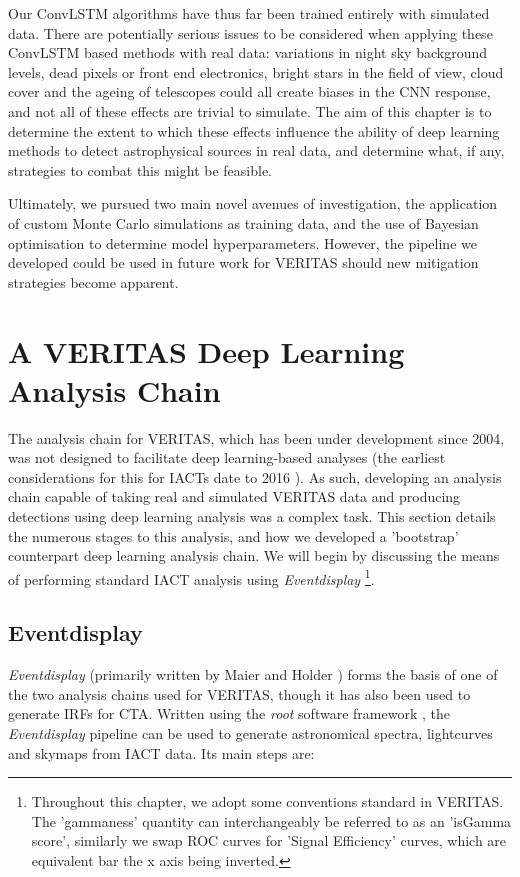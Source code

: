 Our ConvLSTM algorithms have thus far been trained entirely with simulated data.  There are potentially serious issues to be considered when applying these ConvLSTM based methods with real data: variations in night sky background levels, dead pixels or front end electronics, bright stars in the field of view, cloud cover and the ageing of telescopes could all create biases in the CNN response, and not all of these effects are trivial to simulate. The aim of this chapter is to determine the extent to which these effects influence the ability of deep learning methods to detect astrophysical sources in real data, and determine what, if any, strategies to combat this might be feasible. 

Ultimately, we pursued two main novel avenues of investigation, the application of custom Monte Carlo simulations as training data, and the use of Bayesian optimisation to determine model hyperparameters. However, the pipeline we developed could be used in future work for VERITAS should new mitigation strategies become apparent.

\section{A VERITAS Deep Learning Analysis Chain}
The analysis chain for VERITAS, which has been under development since 2004, was not designed to facilitate deep learning-based analyses (the earliest considerations for this for IACTs date to 2016 \cite{feng2016}). As such, developing an analysis chain capable of taking real and simulated VERITAS data and producing detections using deep learning analysis was a complex task. This section details the numerous stages to this analysis, and how we developed a 'bootstrap' counterpart deep learning analysis chain. We will begin by discussing the means of performing standard IACT analysis using \textit{Eventdisplay} \footnote{Throughout this chapter, we adopt some conventions standard in VERITAS. The 'gammaness' quantity can interchangeably be referred to as an 'isGamma score', similarly we swap ROC curves for 'Signal Efficiency' curves, which are equivalent bar the x axis being inverted.}.

\subsection{Eventdisplay}

\textit{Eventdisplay} (primarily written by Maier and Holder \cite{evdisp}) forms the basis of one of the two analysis chains used for VERITAS, though it has also been used to generate IRFs for CTA. Written using the \textit{root} software framework \cite{root}, the \textit{Eventdisplay} pipeline can be used to generate astronomical spectra, lightcurves and skymaps from IACT data. Its main steps are:

